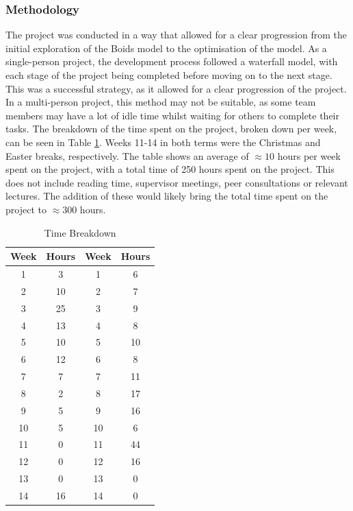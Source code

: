 \documentclass[12pt]{article}
\begin{document}
\subsubsection{Methodology}
The project was conducted in a way that allowed for a clear progression from the initial exploration of the Boids model to the optimisation of the model. As a single-person project, the development process followed a waterfall model, with each stage of the project being completed before moving on to the next stage. This was a successful strategy, as it allowed for a clear progression of the project. In a multi-person project, this method may not be suitable, as some team members may have a lot of idle time whilst waiting for others to complete their tasks. The breakdown of the time spent on the project, broken down per week, can be seen in Table \ref{tab:time-breakdown}. Weeks 11-14 in both terms were the Christmas and Easter breaks, respectively. The table shows an average of $\approx 10$ hours per week spent on the project, with a total time of 250 hours spent on the project. This does not include reading time, supervisor meetings, peer consultations or relevant lectures. The addition of these would likely bring the total time spent on the project to $\approx 300$ hours.

\begin{table}[ht]
    \centering
    \begin{tabular}{|c|c||c|c|}
        \hline
        Week & Hours & Week & Hours \\
        \hline
        1 & 3 & 1 & 6 \\
        2 & 10 & 2 & 7 \\
        3 & 25 & 3 & 9 \\
        4 & 13 & 4 & 8 \\
        5 & 10 & 5 & 10 \\
        6 & 12 & 6 & 8 \\
        7 & 7 & 7 & 11 \\
        8 & 2 & 8 & 17 \\
        9 & 5 & 9 & 16 \\
        10 & 5 & 10 & 6 \\
        11 & 0 & 11 & 44 \\
        12 & 0 & 12 & 16 \\
        13 & 0 & 13 & 0 \\
        14 & 16 & 14 & 0 \\
        \hline
    \end{tabular}
    \caption{Time Breakdown}
    \label{tab:time-breakdown}
\end{table}
\end{document}
